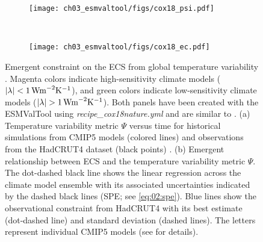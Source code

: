 \begin{figure}[t]
  \centering
  \begin{subfigure}[b]{\SubfigureWidth{}}
    \texttt{[image: ch03\_esmvaltool/figs/cox18\_psi.pdf]}
    \caption{}
    \label{fig:03:cox18:a}
  \end{subfigure}
  ~
  \begin{subfigure}[b]{\SubfigureWidth{}}
    \texttt{[image: ch03\_esmvaltool/figs/cox18\_ec.pdf]}
    \caption{}
    \label{fig:03:cox18:b}
  \end{subfigure}
  \caption[
    Emergent constraint on the \acf{ECS} from global temperature variability.
  ]{
    Emergent constraint on the \acf{ECS} from global temperature variability
    \autocite{Cox2018}. Magenta colors indicate high-sensitivity climate models
    ($\abs*{\lambda} < 1 \unit{W m^{-2} K^{-1}}$), and green colors indicate
    low-sensitivity climate models ($\abs*{\lambda} > 1 \unit{W m^{-2}
      K^{-1}}$). Both panels have been created with the \acs{ESMValTool} using
    \emph{recipe\_cox18nature.yml} and are similar to \textcite{Cox2018}. (a)
    Temperature variability metric $\Psi$ versus time for historical
    simulations from \acs{CMIP}5 models (colored lines) and observations from
    the HadCRUT4 dataset (black points) \autocite{Morice2012}. (b) Emergent
    relationship between \acs{ECS} and the temperature variability metric
    $\Psi$. The dot-dashed black line shows the linear regression across the
    climate model ensemble with its associated uncertainties indicated by the
    dashed black lines (\acl{SPE}; see \cref{eq:02:spe}). Blue lines show the
    observational constraint from HadCRUT4 with its best estimate (dot-dashed
    line) and standard deviation (dashed lines). The letters represent
    individual \acs{CMIP}5 models (see \textcite{Cox2018} for details).
  }
  \label{fig:03:cox18}
\end{figure}

